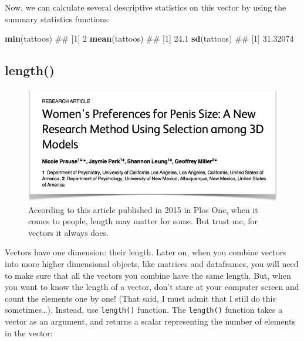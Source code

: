 \documentclass[]{book}
\newenvironment{Shaded}{\begin{snugshade}}{\end{snugshade}}
\newcommand{\KeywordTok}[1]{\textcolor[rgb]{0.13,0.29,0.53}{\textbf{#1}}}
\newcommand{\NormalTok}[1]{#1}
\theoremstyle{definition}
\theoremstyle{definition}
\theoremstyle{remark}
\begin{document}
Now, we can calculate several descriptive statistics on this vector by
using the summary statistics functions:

\begin{Shaded}
\begin{Highlighting}[]
\KeywordTok{min}\NormalTok{(tattoos)}
\NormalTok{## [1] 2}
\KeywordTok{mean}\NormalTok{(tattoos)}
\NormalTok{## [1] 24.1}
\KeywordTok{sd}\NormalTok{(tattoos)}
\NormalTok{## [1] 31.32074}
\end{Highlighting}
\end{Shaded}

\subsection{length()}\label{length}

\begin{figure}

{\centering \includegraphics[width=0.5\linewidth]{images/penissize} 

}

\caption{According to this article published in 2015 in Plos One, when it comes to people, length may matter for some. But trust me, for vectors it always does.}\label{fig:unnamed-chunk-121}
\end{figure}

Vectors have one dimension: their length. Later on, when you combine
vectors into more higher dimensional objects, like matrices and
dataframes, you will need to make sure that all the vectors you combine
have the same length. But, when you want to know the length of a vector,
don't stare at your computer screen and count the elements one by one!
(That said, I must admit that I still do this sometimes\ldots{}).
Instead, use \texttt{length()} function. The \texttt{length()} function
takes a vector as an argument, and returns a scalar representing the
number of elements in the vector:
\end{document}

